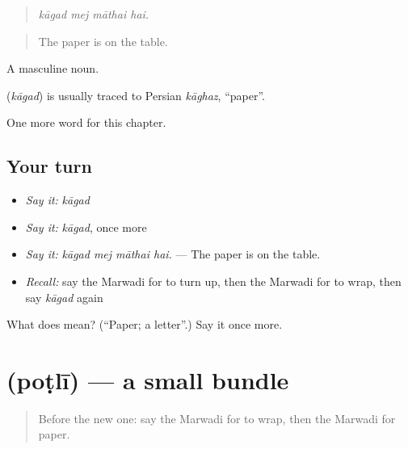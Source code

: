 \begin{quote}
   
\end{quote}

\begin{quote}
\emph{kāgad mej māthai hai.}
\end{quote}

\begin{quote}
The paper is on the table.
\end{quote}

A masculine noun.

\begin{cousinweb}
\textbf{} (\emph{kāgad}) is usually traced to Persian \emph{kāghaz}, \textquotedblleft{}paper\textquotedblright{}.
\end{cousinweb}

\begin{grammarlens}[title={What you've built}]
One more word for this chapter.
\end{grammarlens}

\subsection*{Your turn}
\begin{itemize}
\raggedright
  \item \emph{Say it:} \emph{kāgad}
  \item \emph{Say it:} \emph{kāgad}, once more
  \item \emph{Say it:} \emph{kāgad mej māthai hai.} — The paper is on the table.
  \item \emph{Recall:} say the Marwadi for to turn up, then the Marwadi for to wrap, then say \emph{kāgad} again
\end{itemize}

\begin{tcolorbox}[breakable,colback=teal!4,colframe=teal!35!black,title={Before you move on}]
What does  mean? (\textquotedblleft{}Paper; a letter\textquotedblright{}.) Say it once more.
\end{tcolorbox}
\section[\texorpdfstring{\mw{पोटली} (poṭlī)}{पोटली (poṭlī)}]{ (poṭlī) — a small bundle}

\label{lesson:MW-C215-potli}



\begin{quote}
Before the new one: say the Marwadi for to wrap, then the Marwadi for paper.
\end{quote}

